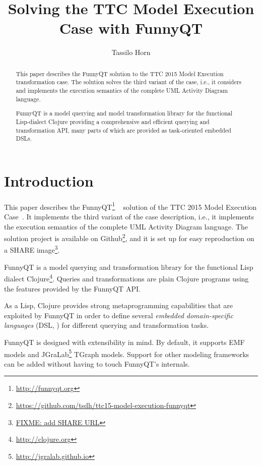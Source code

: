 \documentclass[submission]{eptcs}
\title{Solving the TTC Model Execution Case with FunnyQT}
\author{Tassilo Horn
  \institute{Institute for Software Technology, University Koblenz-Landau, Germany}
  \email{horn@uni-koblenz.de}}
\begin{document}
\maketitle

\begin{abstract}
  This paper describes the FunnyQT solution to the TTC 2015 Model Execution
  transformation case.  The solution solves the third variant of the case,
  i.e., it considers and implements the execution semantics of the complete UML
  Activity Diagram language.

  FunnyQT is a model querying and model transformation library for the
  functional Lisp-dialect Clojure providing a comprehensive and efficient
  querying and transformation API, many parts of which are provided as
  task-oriented embedded DSLs.
\end{abstract}


\section{Introduction}
\label{sec:introduction}

This paper describes the FunnyQT\footnote{\url{http://funnyqt.org}}
~\cite{Horn2013MQWFQ,funnyqt-icgt15} solution of the TTC 2015 Model Execution
Case~\cite{model-execution-case-desc}.  It implements the third variant of the
case description, i.e., it implements the execution semantics of the complete
UML Activity Diagram language.  The solution project is available on
Github\footnote{\url{https://github.com/tsdh/ttc15-model-execution-funnyqt}},
and it is set up for easy reproduction on a SHARE image\footnote{\url{FIXME:
    add SHARE URL}}.

FunnyQT is a model querying and transformation library for the functional Lisp
dialect Clojure\footnote{\url{http://clojure.org}}.  Queries and
transformations are plain Clojure programs using the features provided by the
FunnyQT API.

As a Lisp, Clojure provides strong metaprogramming capabilities that are
exploited by FunnyQT in order to define several \emph{embedded domain-specific
  languages} (DSL, \cite{book:Fowler2010DSL}) for different querying and
transformation tasks.

FunnyQT is designed with extensibility in mind.  By default, it supports EMF
\cite{Steinberg2008EEM} models and
JGraLab\footnote{\url{http://jgralab.github.io}} TGraph models.  Support for
other modeling frameworks can be added without having to touch FunnyQT's
internals.
\end{document}
